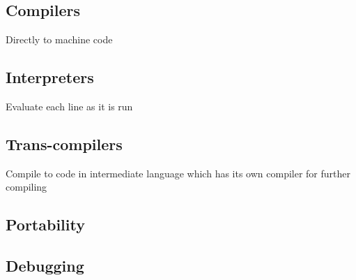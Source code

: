 
\subsection{Compilers}

Directly to machine code

\subsection{Interpreters}

Evaluate each line as it is run

\subsection{Trans-compilers}

Compile to code in intermediate language which has its own compiler for further compiling

\subsection{Portability}

\subsection{Debugging}


